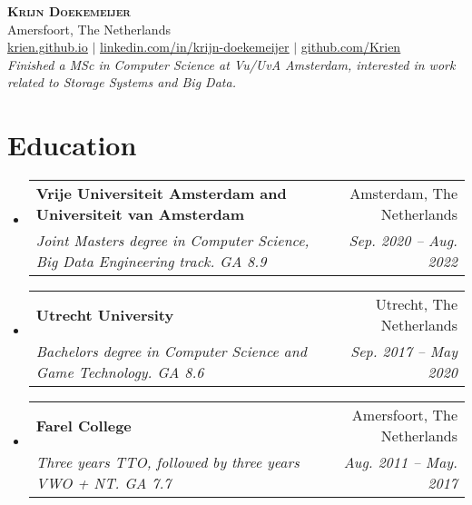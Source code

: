 \documentclass[letterpaper,11pt]{article}
\makeatletter
\newcommand{\resumeSubheading}[4]{
  \vspace{-2pt}\item
    \begin{tabular*}{0.97\textwidth}[t]{l@{\extracolsep{\fill}}r}
      \textbf{#1} & #2 \\
      \textit{\small#3} & \textit{\small #4} \\
    \end{tabular*}\vspace{-7pt}
}
\newcommand{\resumeSubHeadingListStart}{\begin{itemize}[leftmargin=0.15in, label={}]}
\newcommand{\resumeSubHeadingListEnd}{\end{itemize}}
\makeatother
\begin{document}

\begin{center}
    \textbf{\Huge \scshape Krijn Doekemeijer} \\ \vspace{1pt}
    \small Amersfoort, The Netherlands \\ \vspace{1pt}
    \href{https://krien.github.io/}{\underline{krien.github.io}} $|$
    \href{https://linkedin.com/in/krijn-doekemeijer-9692801aa}{\underline{linkedin.com/in/krijn-doekemeijer}} $|$
    \href{https://github.com/Krien}{\underline{github.com/Krien}} \\
    \textit{ Finished a MSc in Computer Science at Vu/UvA Amsterdam, interested in work related to Storage Systems and Big Data. } 
\end{center}


\section{Education}
  \resumeSubHeadingListStart
     \resumeSubheading
      {Vrije Universiteit Amsterdam and Universiteit van Amsterdam}{Amsterdam, The Netherlands}
      {Joint Masters degree in Computer Science, Big Data Engineering track. GA 8.9}{Sep. 2020 -- Aug. 2022}
    \resumeSubheading
      {Utrecht University}{Utrecht, The Netherlands}
      {Bachelors degree in Computer Science and Game Technology. GA 8.6 }{Sep. 2017 -- May 2020}
    \resumeSubheading
      {Farel College}{Amersfoort, The Netherlands}
      {Three years TTO, followed by three years VWO + NT. GA 7.7 }{Aug. 2011 -- May. 2017}
  \resumeSubHeadingListEnd
\end{document}
